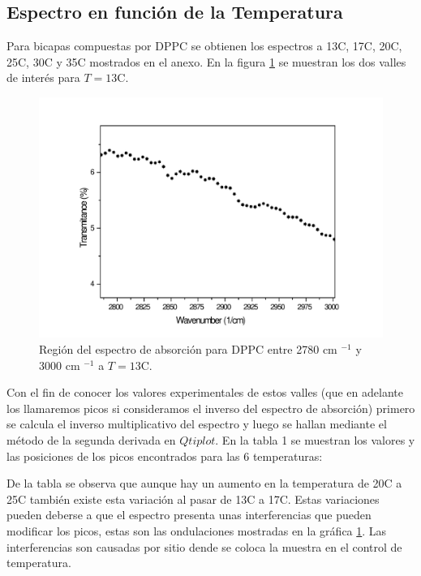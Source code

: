 \documentclass[%
 reprint,
 amsmath,amssymb,
 aps,
]{revtex4-2}
\begin{document}
\subsection{Espectro en funci\'{o}n de la Temperatura}
Para bicapas compuestas por DPPC se obtienen los espectros a 13\textdegree C, 17\textdegree C, 20\textdegree C, 25\textdegree C, 30\textdegree C y 35\textdegree C mostrados en el anexo. En la figura \ref{fig:espa13} se muestran los dos valles de inter\'{e}s para $T=13$\textdegree C.
\begin{figure}[h]
\includegraphics[scale=0.3]{FTIR/13C.pdf}
  \caption{Regi\'{o}n del espectro de absorci\'{o}n para DPPC entre 2780 cm $^{-1}$ y 3000 cm $^{-1}$ a $T=13$\textdegree C.}
  \label{fig:espa13}
\end{figure}
Con el fin de conocer los valores experimentales de estos valles (que en adelante los llamaremos picos si consideramos el inverso del espectro de absorci\'{o}n) primero se calcula el inverso multiplicativo del espectro y luego se hallan mediante el m\'{e}todo de la segunda derivada en $Qtiplot$. En la tabla 1 se muestran los valores y las posiciones de los picos encontrados para las 6 temperaturas:

De la tabla se observa que aunque hay un aumento en la temperatura de 20\textdegree C a 25\textdegree C tambi\'{e}n existe esta variaci\'{o}n al pasar de 13\textdegree C a 17\textdegree C. Estas variaciones pueden deberse a  que el espectro presenta unas interferencias que pueden modificar los picos, estas son las ondulaciones mostradas en la gr\'{a}fica \ref{fig:espa13}. Las interferencias son causadas por sitio dende se coloca la muestra en el control de temperatura.
\end{document}
